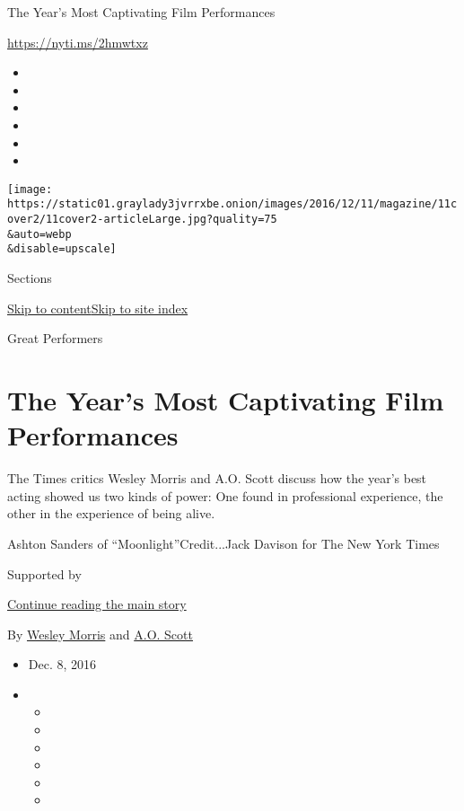 The Year's Most Captivating Film Performances

\url{https://nyti.ms/2hmwtxz}

\begin{itemize}
\item
\item
\item
\item
\item
\item
\end{itemize}

\texttt{[image: https://static01.graylady3jvrrxbe.onion/images/2016/12/11/magazine/11cover2/11cover2-articleLarge.jpg?quality=75\\\&auto=webp\\\&disable=upscale]}

Sections

\protect\hyperlink{site-content}{Skip to
content}\protect\hyperlink{site-index}{Skip to site index}

Great Performers

\hypertarget{the-years-most-captivating-film-performances}{%
\section{The Year's Most Captivating Film
Performances}\label{the-years-most-captivating-film-performances}}

The Times critics Wesley Morris and A.O. Scott discuss how the year's
best acting showed us two kinds of power: One found in professional
experience, the other in the experience of being alive.

Ashton Sanders of ``Moonlight''Credit...Jack Davison for The New York
Times

Supported by

\protect\hyperlink{after-sponsor}{Continue reading the main story}

By \href{https://www.nytimes3xbfgragh.onion/by/wesley-morris}{Wesley
Morris} and \href{https://www.nytimes3xbfgragh.onion/by/a-o--scott}{A.O.
Scott}

\begin{itemize}
\item
  Dec. 8, 2016
\item
  \begin{itemize}
  \item
  \item
  \item
  \item
  \item
  \item
  \end{itemize}
\end{itemize}

